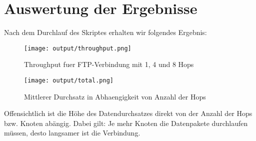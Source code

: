 \documentclass[12pt,a4paper,titlepage]{article}
\begin{document}
\section{Auswertung der Ergebnisse}

Nach dem Durchlauf des Skriptes erhalten wir folgendes Ergebnis:

\begin{figure}[h]
	\centering
% 	
	\texttt{[image: output/throughput.png]}
	\caption{Throughput fuer FTP-Verbindung mit 1, 4 und 8 Hops}
	\label{Durchsatz}
\end{figure}

\begin{figure}[h]
	\centering
% 	
	\texttt{[image: output/total.png]}
	\caption{Mittlerer Durchsatz in Abhaengigkeit von Anzahl der Hops}
	\label{Durchsatz2}
\end{figure}

Offensichtlich ist die Höhe des Datendurchsatzes direkt von der Anzahl der Hops bzw. Knoten abängig. Dabei gilt: Je mehr Knoten die Datenpakete durchlaufen müssen, desto langsamer ist die Verbindung.
\end{document}

